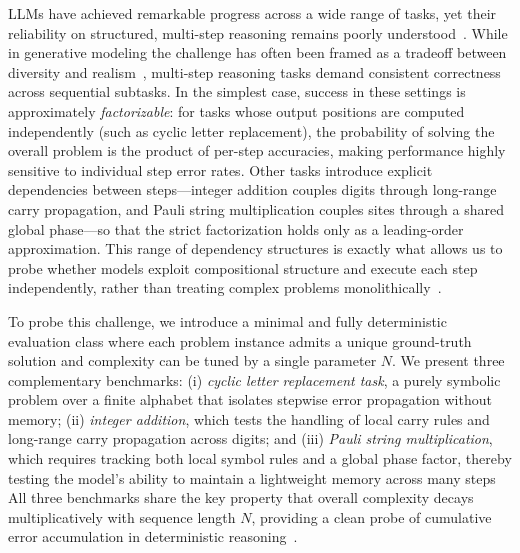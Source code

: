\documentclass{article}
\theoremstyle{plain}
\begin{document}
LLMs have achieved remarkable progress across a wide range of tasks, yet their reliability on structured, multi-step reasoning remains poorly understood~\citep{wei2022chain,havrilla2024glore}. While in generative modeling the challenge has often been framed as a tradeoff between diversity and realism~\citep{astolfi2024consistency}, multi-step reasoning tasks demand consistent correctness across sequential subtasks. In the simplest case, success in these settings is approximately \emph{factorizable}: for tasks whose output positions are computed independently (such as cyclic letter replacement), the probability of solving the overall problem is the product of per-step accuracies, making performance highly sensitive to individual step error rates. Other tasks introduce explicit dependencies between steps---integer addition couples digits through long-range carry propagation, and Pauli string multiplication couples sites through a shared global phase---so that the strict factorization holds only as a leading-order approximation. This range of dependency structures is exactly what allows us to probe whether models exploit compositional structure and execute each step independently, rather than treating complex problems monolithically~\citep{lake2018generalization}.

To probe this challenge, we introduce a minimal and fully deterministic evaluation class where each problem instance admits a unique ground-truth solution and complexity can be tuned by a single parameter $N$. We present three complementary benchmarks: (i) \emph{cyclic letter replacement task}, a purely symbolic problem over a finite alphabet that isolates stepwise error propagation without memory; (ii) \emph{integer addition}, which tests the handling of local carry rules and long-range carry propagation across digits; and (iii) \emph{Pauli string multiplication}, which requires tracking both local symbol rules and a global phase factor, thereby testing the model’s ability to maintain a lightweight memory across many steps All three benchmarks share the key property that overall complexity decays multiplicatively with sequence length $N$, providing a clean probe of cumulative error accumulation in deterministic reasoning~\citep{wang2022self,liu2023lost,turpin2023language,wan2025fano}.
\end{document}
